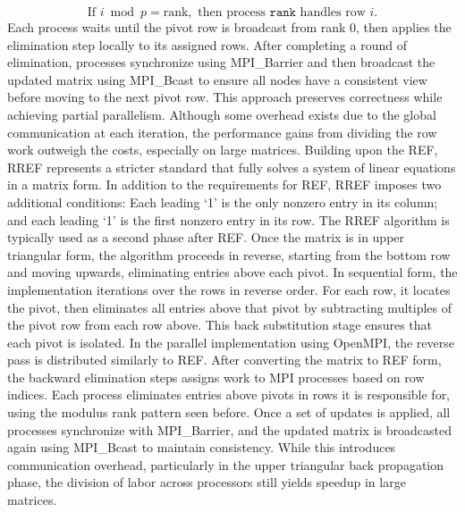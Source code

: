 \documentclass[12pt]{article}
\begin{document}
\[
\text{If } i \bmod p = \text{rank}, \text{ then process } \texttt{rank} \text{ handles row } i.
\]
Each process waits until the pivot row is broadcast from rank 0, then applies the elimination step locally to its assigned rows. After completing a round of elimination, processes synchronize using MPI_Barrier and then broadcast the updated matrix using MPI_Bcast to ensure all nodes have a consistent view before moving to the next pivot row. This approach preserves correctness while achieving partial parallelism. Although some overhead exists due to the global communication at each iteration, the performance gains from dividing the row work outweigh the costs, especially on large matrices.
Building upon the REF, RREF represents a stricter standard that fully solves a system of linear equations in a matrix form. In addition to the requirements for REF, RREF imposes two additional conditions: Each leading ‘1’ is the only nonzero entry in its column; and each leading ‘1’ is the first nonzero entry in its row. The RREF algorithm is typically used as a second phase after REF. Once the matrix is in upper triangular form, the algorithm proceeds in reverse, starting from the bottom row and moving upwards, eliminating entries above each pivot. In sequential form, the implementation iterations over the rows in reverse order. For each row, it locates the pivot, then eliminates all entries above that pivot by subtracting multiples of the pivot row from each row above. This back substitution stage ensures that each pivot is isolated. In the parallel implementation using OpenMPI, the reverse pass is distributed similarly to REF. After converting the matrix to REF form, the backward elimination steps assigns work to MPI processes based on row indices. Each process eliminates entries above pivots in rows it is responsible for, using the modulus rank pattern seen before. Once a set of updates is applied, all processes synchronize with MPI_Barrier, and the updated matrix is broadcasted again using MPI_Bcast to maintain consistency. While this introduces communication overhead, particularly in the upper triangular back propagation phase, the division of labor across processors still yields speedup in large matrices. 
\end{document}
